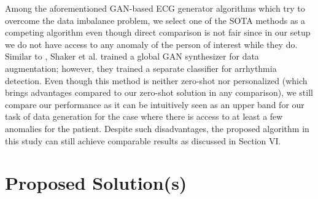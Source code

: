 \documentclass[journal,transmag]{IEEEtran}
\begin{document}
Among the aforementioned GAN-based ECG generator algorithms which try to overcome the data imbalance problem, we select one of the SOTA methods \cite{shaker2020generalization} as a competing algorithm even though direct comparison is not fair since in our setup we do not have access to any anomaly of the person of interest while they do. Similar to \cite{zhou2021fully}, Shaker et al. \cite{shaker2020generalization} trained a global GAN synthesizer for data augmentation; however, they trained a separate classifier for arrhythmia detection. Even though this method is neither zero-shot nor personalized (which brings advantages compared to our zero-shot solution in any comparison), we still compare our performance as it can be intuitively seen as an upper band for our task of data generation for the case where there is access to at least a few anomalies for the patient. Despite such disadvantages, the proposed algorithm in this study can still achieve comparable results as discussed in Section VI.

\section{Proposed Solution(s)}
\label{sec:proposed}
\end{document}
